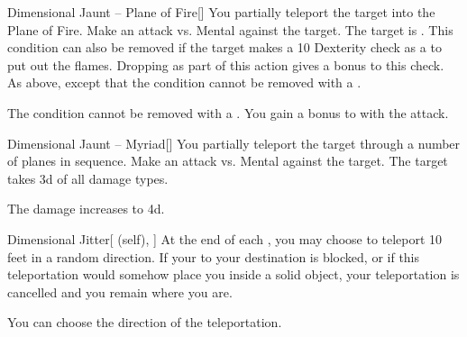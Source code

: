 \lowercase{\hypertarget{spell:Dimensional Jaunt -- Plane of Fire}{}}\label{spell:Dimensional Jaunt -- Plane of Fire}
\begin{freeability}[Rank 4]{\hypertarget{spell:Dimensional Jaunt -- Plane of Fire}{Dimensional Jaunt -- Plane of Fire}}[]
You partially teleport the target into the Plane of Fire.
Make an attack vs. Mental against the target.
\hit The target is .
This condition can also be removed if the target makes a  10 Dexterity check as a  to put out the flames.
Dropping  as part of this action gives a  bonus to this check.
\crit As above, except that the condition cannot be removed with a .

\rankline
{} The condition cannot be removed with a .
 You gain a  bonus to  with the attack.
\end{freeability}
\vspace{0.25em}



\lowercase{\hypertarget{spell:Dimensional Jaunt -- Myriad}{}}\label{spell:Dimensional Jaunt -- Myriad}
\begin{freeability}[Rank 5]{\hypertarget{spell:Dimensional Jaunt -- Myriad}{Dimensional Jaunt -- Myriad}}[]
You partially teleport the target through a number of planes in sequence.
Make an attack vs. Mental against the target.
\hit The target takes  \plus3d of all damage types.

\rankline
{} The damage increases to  \plus4d.
\end{freeability}
\vspace{0.25em}



\lowercase{\hypertarget{spell:Dimensional Jitter}{}}\label{spell:Dimensional Jitter}
\begin{attuneability}[Rank 5]{\hypertarget{spell:Dimensional Jitter}{Dimensional Jitter}}[ (self), ]
At the end of each , you may choose to teleport 10 feet in a random direction.
If your  to your destination is blocked, or if this teleportation would somehow place you inside a solid object, your teleportation is cancelled and you remain where you are.

\rankline
{} You can choose the direction of the teleportation.
\end{attuneability}
\vspace{0.25em}



